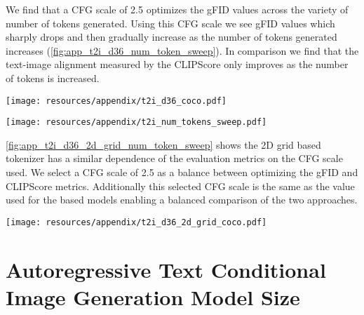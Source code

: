 We find that a CFG scale of 2.5 optimizes the gFID values across the variety of number of tokens generated. Using this CFG scale we see gFID values which sharply drops and then gradually increase as the number of tokens generated increases (\cref{fig:app_t2i_d36_num_token_sweep}). In comparison we find that the text-image alignment measured by the CLIPScore only improves as the number of tokens is increased.

\begin{figure*}[h]
\centering
\texttt{[image: resources/appendix/t2i\_d36\_coco.pdf]}
\caption{
\textbf{Text-conditional 3.06B AR with \oursxlarge guidance and number of tokens ablation.}
gFID (left) and CLIPScore (right) metrics measured with respect to the COCO validation set at varying numbers of tokens.
}
\label{fig:app_t2i_d36_cfg_and_num_token_sweep}
\end{figure*}

\begin{figure*}[h]
\centering
\texttt{[image: resources/appendix/t2i\_num\_tokens\_sweep.pdf]}
\caption{
\textbf{Text-conditional 3.06B AR with \oursxlarge image generation vs number of tokens.} All metrics are computed using a CFG scale of 2.5 during generation. Left shows the rFID of the DFN trained \oursxlarge on the COCO validation set. The AR image generation gFID (middle) and CLIPScore (right) on the COCO validation set as functions of the number of generated tokens.
}
\label{fig:app_t2i_d36_num_token_sweep}
\end{figure*}

\cref{fig:app_t2i_d36_2d_grid_num_token_sweep} shows the 2D grid based tokenizer has a similar dependence of the evaluation metrics on the CFG scale used. We select a CFG scale of 2.5 as a balance between optimizing the gFID and CLIPScore metrics. Additionally this selected CFG scale is the same as the value used for the \ours based models enabling a balanced comparison of the two approaches.

\begin{figure*}[h]
\centering
\texttt{[image: resources/appendix/t2i\_d36\_2d\_grid\_coco.pdf]}
\caption{
\textbf{Text-conditional 3.06B AR with 2D grid tokenizer guidance ablation.}
gFID (left) and CLIPScore (right) metrics measured with respect to the COCO validation set at varying numbers of tokens.
}
\label{fig:app_t2i_d36_2d_grid_num_token_sweep}
\end{figure*}


\clearpage
\section{Autoregressive Text Conditional Image Generation Model Size}
\label{sec:app_t2i_model_size}

